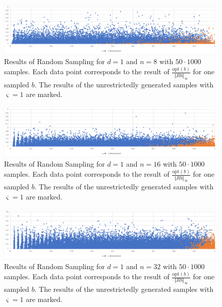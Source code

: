 \begin{figure}
\begin{center}
\includegraphics[scale=.48]{scatter-alpha-8-50-1000.png}
\end{center}
\caption{Results of Random Sampling for $d=1$ and $n=8$ with $50\cdot 1000$ samples. Each data point corresponds to the result of $\frac{\text{opt}(b)}{\Vert Rb\Vert_\infty}$ for one sampled $b$. The results of the unrestrictedly generated samples with $\varsigma=1$ are marked.}\label{res_rsample_8}
\end{figure}
\begin{figure}
\begin{center}
\includegraphics[scale=.48]{scatter-alpha-16-50-1000.png}
\end{center}
\caption{Results of Random Sampling for $d=1$ and $n=16$ with $50\cdot 1000$ samples. Each data point corresponds to the result of $\frac{\text{opt}(b)}{\Vert Rb\Vert_\infty}$ for one sampled $b$. The results of the unrestrictedly generated samples with $\varsigma=1$ are marked.}\label{res_rsample_16}
\end{figure}
\begin{figure}
\begin{center}
\includegraphics[scale=.48]{scatter-alpha-32-50-1000.png}
\end{center}
\caption{Results of Random Sampling for $d=1$ and $n=32$ with $50\cdot 1000$ samples. Each data point corresponds to the result of $\frac{\text{opt}(b)}{\Vert Rb\Vert_\infty}$ for one sampled $b$. The results of the unrestrictedly generated samples with $\varsigma=1$ are marked.}\label{res_rsample_32}
\end{figure}
